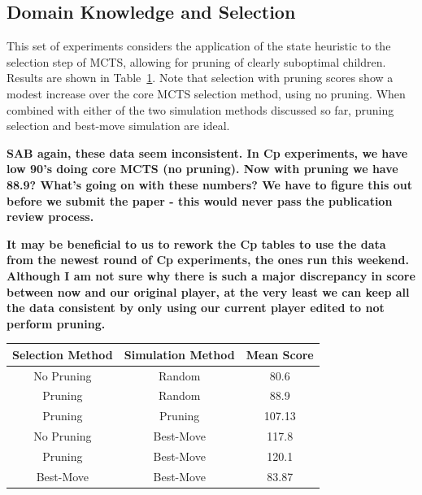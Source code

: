 \documentclass[letterpaper]{article}
\begin{document}
\subsection{Domain Knowledge and Selection}

%

This set of experiments considers the application of the state heuristic to the selection step of MCTS, allowing for pruning of clearly suboptimal children. Results are shown in Table~\ref{tbl:Selection}. Note that selection with pruning scores show a modest increase over the core MCTS selection method, using no pruning. When combined with either of the two simulation methods discussed so far, pruning selection and best-move simulation are ideal.

{\bf SAB again, these data seem inconsistent. In Cp experiments, we have low 90's doing core MCTS (no pruning). Now with pruning we have 88.9? What's going on with these numbers? We have to figure this out before we submit the paper - this would never pass the publication review process.}

{\bf It may be beneficial to us to rework the Cp tables to use the data from the newest round of Cp experiments, the ones run this weekend. Although I am not sure why there is such a major discrepancy in score between now and our original player, at the very least we can keep all the data consistent by only using our current player edited to not perform pruning.}

\begin{table}
\label{tbl:Selection}
\centering
\begin{tabular}{c c c}
\hline
Selection Method & Simulation Method & Mean Score \\
\hline
No Pruning & Random & 80.6 \\
Pruning & Random & 88.9 \\
Pruning & Pruning & 107.13 \\
No Pruning & Best-Move & 117.8 \\
Pruning & Best-Move & 120.1 \\
Best-Move & Best-Move & 83.87 \\
\hline
\end{tabular}
\end{table}
\end{document}
